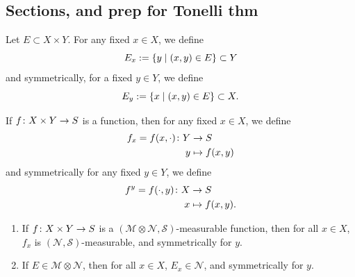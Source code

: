 \documentclass[11pt,leqno,oneside]{amsbook}
\numberwithin{thm}{section}
\newcommand{\M}{\mathcal{M}}
\newcommand{\cN}{\mathcal{N}}
\newcommand{\cS}{\mathcal{S}}
\newcommand{\x}{\times}
\newcommand{\ox}{\otimes}
\begin{document}
\subsection*{Sections, and prep for Tonelli thm}
\begin{defn}
  Let $E \subset X \x Y$.  For any fixed $x \in X$, we define $$E_x := \{y \mid (x,y) \in E\} \subset Y$$ and symmetrically, for a fixed $y \in Y$, we define $$E_y := \{x \mid (x,y) \in E\} \subset X.$$
\end{defn}
\begin{defn}
  If $f \from X \x Y \to S$ is a function, then for any fixed $x \in X$, we define
  \begin{align*}
    f_x = f(x, \cdot) \colon Y &\to S \\
    y &\mapsto f(x,y)
  \end{align*}
  and symmetrically for any fixed $y \in Y$, we define
  \begin{align*}
    f^y = f(\cdot, y) \colon X &\to S \\
    x &\mapsto f(x,y).
  \end{align*}
\end{defn}
\begin{prop}
  \mbox{}
  \begin{enumerate}[label=(\arabic{*})]
    \item If $f \from X \x Y \to S$ is a $(\M \ox \cN, \cS)$-measurable function, then for all $x \in X$, $f_x$ is $(\cN, \cS)$-measurable, and symmetrically for $y$.
    \item If $E \in \M \ox \cN$, then for all $x \in X$, $E_x \in \cN$, and symmetrically for $y$.
  \end{enumerate}
\end{prop}
\end{document}
